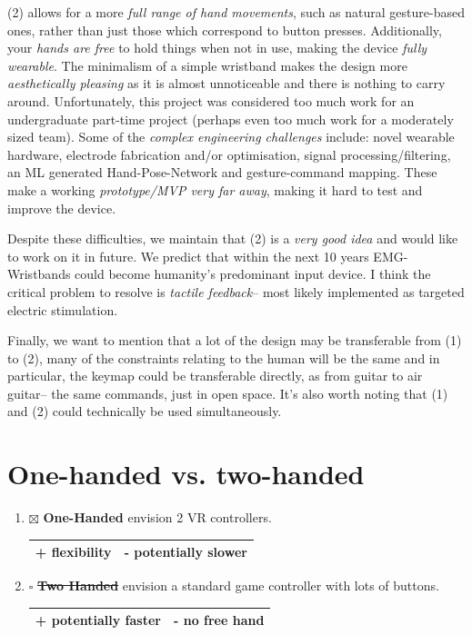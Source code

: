\documentclass[logo,bsc,singlespacing,parskip]{infthesis}
\begin{document}
(2) allows for a more \emph{full range of hand movements}, such as natural gesture-based ones, rather than just those which correspond to button presses.
Additionally, your \emph{hands are free} to hold things when not in use, making the device \emph{fully wearable}.
The minimalism of a simple wristband makes the design more \emph{aesthetically pleasing} as it is almost unnoticeable and there is nothing to carry around.
Unfortunately, this project was considered too much work for an undergraduate part-time project (perhaps even too much work for a moderately sized team).
Some of the \emph{complex engineering challenges} include: novel wearable hardware, electrode fabrication and/or optimisation, signal processing/filtering, an ML generated Hand-Pose-Network and gesture-command mapping.
These make a working \emph{prototype/MVP very far away}, making it hard to test and improve the device.

Despite these difficulties, we maintain that (2) is a \emph{very good idea} and would like to work on it in future.
We predict that within the next 10 years EMG-Wristbands could become humanity's predominant input device. I think the critical problem to resolve is \emph{tactile feedback}-- most likely implemented as targeted electric stimulation.

Finally, we want to mention that a lot of the design may be transferable from (1) to (2), many of the constraints relating to the human will be the same and in particular, the keymap could be transferable directly, as from guitar to air guitar-- the same commands, just in open space.
It's also worth noting that (1) and (2) could technically be used simultaneously.
\section{One-handed vs. two-handed}
\label{sec:org9097ce1}
\begin{enumerate}
\item{$\boxtimes$} \textbf{One-Handed} envision 2 VR controllers.
\begin{longtable}{|p{6.25cm}|p{6.25cm}|}
\hline
+ flexibility & - potentially slower\\
\hline
\end{longtable}
\item{$\square$} \sout{\textbf{Two Handed}} envision a standard game controller with lots of buttons.
\begin{longtable}{|p{6.25cm}|p{6.25cm}|}
\hline
+ potentially faster & - no free hand\\
\hline
\end{longtable}
\end{enumerate}
\end{document}
